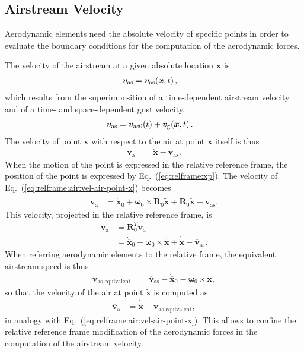 \documentclass[10pt,dvips,fleqn,subeqn]{report}
\newcommand{\T}[1]{\bm{#1}}
\newcommand{\TT}[1]{\bm{#1}}
\begin{document}
\subsection{Airstream Velocity}
\label{sec:nodes:structural nodes:airstream velocity}
Aerodynamic elements need the absolute velocity of specific points
in order to evaluate the boundary conditions for the computation
of the aerodynamic forces.

The velocity of the airstream at a given absolute location $\T{x}$ is
\begin{align}
	\T{v}_{\text{as}}
	&= \T{v}_{\text{as}}\!\plbr{\T{x}, t} ,
\end{align}
which results from the superimposition of a time-dependent airstream velocity
and of a time- and space-dependent gust velocity,
\begin{align}
	\T{v}_{\text{as}}
	&= \T{v}_{\text{as0}}\!\plbr{t}
	+ \T{v}_{\text{g}}\!\plbr{\T{x}, t} .
\end{align}
The velocity of point $\T{x}$ with respect to the air at point $\T{x}$
itself is thus
\begin{align}
	\T{v}_{\text{a}}
	&= \dot{\T{x}}
	- \T{v}_{\text{as}} .
	\label{eq:relframe:air:vel-air-point-x}
\end{align}
When the motion of the point is expressed in the relative reference frame,
the position of the point is expressed by Eq.~(\ref{eq:relframe:xp}).
The velocity of Eq.~(\ref{eq:relframe:air:vel-air-point-x}) becomes
\begin{align}
	\T{v}_{\text{a}}
	&= \dot{\T{x}}_0
	+ \T{\omega}_0 \times \TT{R}_0 \tilde{\T{x}}
	+ \TT{R}_0 \dot{\tilde{\T{x}}}
	- \T{v}_{\text{as}} .
\end{align}
This velocity, projected in the relative reference frame, is
\begin{align}
	\overline{\T{v}}_{\text{a}}
	&= \TT{R}_0^T \T{v}_{\text{a}} \nonumber \\
	&= \dot{\overline{\T{x}}}_0
	+ \overline{\T{\omega}}_0 \times \tilde{\T{x}}
	+ \dot{\tilde{\T{x}}}
	- \overline{\T{v}}_{\text{as}} .
\end{align}
When referring aerodynamic elements to the relative frame,
the equivalent airstream speed is thus
\begin{align}
	\T{v}_{\text{as equivalent}}
	&=
	\overline{\T{v}}_{\text{as}}
	- \dot{\overline{\T{x}}}_0
	- \overline{\T{\omega}}_0 \times \tilde{\T{x}} ,
\end{align}
so that the velocity of the air at point $\tilde{\T{x}}$ is computed as
\begin{align}
	\overline{\T{v}}_{\text{a}}
	&= \dot{\tilde{\T{x}}}
	- \T{v}_{\text{as equivalent}} ,
\end{align}
in analogy with Eq.~(\ref{eq:relframe:air:vel-air-point-x}).
This allows to confine the relative reference frame modification
of the aerodynamic forces in the computation of the airstream velocity.
\end{document}
